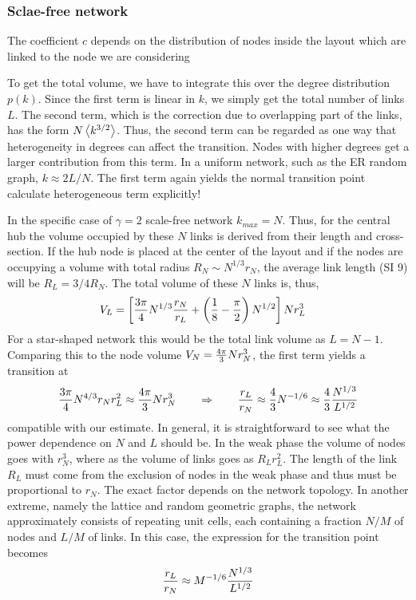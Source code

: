 \documentclass[11pt]{article}
\begin{document}
\subsubsection{Sclae-free network}


The coefficient $c$ depends on the distribution of nodes inside the layout which are linked to the node we are considering 

To get the total volume, we have to integrate this over the degree distribution $p(k) $. 
Since the first term is linear in $k$, we simply get the total number of links $L$. 
The second term, which is the correction due to overlapping part of the links, has the form $N \left<k^{3/2}\right>$. 
Thus, the second term can be regarded as one way that heterogeneity in degrees can affect the transition.
Nodes with higher degrees get a larger contribution from this term. 
In a uniform network, such as the ER random graph, $k\approx 2L/N$. 
The first term again yields the normal transition point {\color{red} calculate heterogeneous term explicitly!}

In the specific case of $\gamma =2 $ scale-free network $k_{max}=N$. 
Thus, for the central hub the volume occupied by these $N$ links is derived from their length and cross-section. 
If the hub node is placed at the center of the layout and if the nodes are occupying a volume with total radius $R_N\sim N^{1/3} r_N$, the average link length (SI 9) will be $R_L = 3/4 R_N$. 
The total volume of these $N$ links is, thus, \begin{align}
    V_L %
    &= \left[{3\pi \over 4} N^{1/3} {r_N \over r_L}  +\pr{ {1\over 8}- {\pi\over 2} } N^{1/2}\right] N r_L^3  
\end{align}
For a star-shaped network this would be the total link volume as $L=N-1$. 
Comparing this to the node volume $V_N = {4\pi \over 3} N r_N^3$, the first term yields a transition at
\[ {3\pi \over 4} N^{4/3} r_N  r_L^2 \approx  {4\pi \over 3} N r_N^3 \qquad \Rightarrow \qquad {r_L\over r_N} \approx {4\over 3} N^{-1/6} \approx {4\over 3} {N^{1/3}\over L^{1/2}} \]
compatible with our estimate. 
In general, it is straightforward to see what the power dependence on $N$ and $L$ should be. 
In the weak phase the volume of nodes goes with $r_N^3$, where as the volume of links goes as $R_L r_L^2$. 
The length of the link $R_L$ must come from the exclusion of nodes in the weak phase and thus must be proportional to $r_N$. 
The exact factor depends on the network topology. 
In another extreme, namely the lattice and random geometric graphs, the network approximately consists of repeating unit cells, each containing a fraction $N/M$ of nodes and $L/M$ of links. 
In this case, the expression for the transition point becomes 
\begin{align}
    {r_L\over r_N} \approx M^{-1/6} {N^{1/3}\over L^{1/2}}
\end{align}
\end{document}
